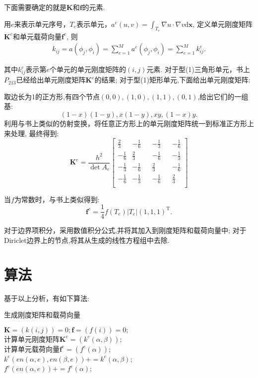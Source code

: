 \documentclass[a4paper, 11pt]{ctexart}
\newcommand\dd{\mathrm{d}}
\newcommand\bx{\boldsymbol{x}}
\newcommand\abs[1]{\lvert #1 \rvert}
\begin{document}
下面需要确定的就是$\boldsymbol K$和$\boldsymbol f$的元素.

用$e$来表示单元序号，$T_e$表示单元，$a^e(u,v)=\int_{T_e}\nabla u·\nabla v\dd \bx$,
定义单元刚度矩阵$\boldsymbol K^e$和单元载荷向量$\boldsymbol f^e$,
则
\begin{align}
	k_{ij}=a(\phi_j,\phi_i)=\sum_{e=1}^Ma^e(\phi_j,\phi_i)=\sum_{e=1}^Mk_{ij}^e.
\end{align}

其中$k_{ij}^e$表示第$e$个单元的单元刚度矩阵的$(i,j)$元素.
对于型(1)三角形单元，书上$P_{213}$已经给出单元刚度矩阵$\boldsymbol K^e$的结果;
对于型(1)矩形单元,下面给出单元刚度矩阵:

取边长为1的正方形,有四个节点$(0,0),(1,0),(1,1),(0,1)$,给出它们的一组基:
$$(1-x)(1-y),x(1-y),xy,(1-x)y.$$
利用与书上类似的仿射变换，将任意正方形上的单元刚度矩阵统一到标准正方形上来处理,
最终得到:
\[ \boldsymbol K^e=\dfrac{h^2}{\det A_e}\begin{bmatrix}
		\frac 23 & -\frac 16 && -\frac 13 && -\frac 16 \\
		-\frac 16 & \frac 23 && -\frac 16 && -\frac 13 \\
		-\frac 13 & -\frac 16 && \frac 23 && -\frac 16 \\
		-\frac 16 & -\frac 13 && -\frac 16 && \frac 23 \\
	\end{bmatrix} \]

当$f$为常数时，与书上类似得到:
\[ \boldsymbol f^e=\dfrac 14f(T_e)\abs{T_e}(1,1,1)^\mathrm T. \]

对于边界项积分，采用数值积分公式,并将其加入到刚度矩阵和载荷向量中;
对于Diriclet边界上的节点,将其从生成的线性方程组中去除.

\section{算法}
基于以上分析，有如下算法:

\begin{algorithm}[H]
\caption{生成刚度矩阵和载荷向量}
\SetAlgoNoLine
$\boldsymbol K= (k(i,j))=0;\boldsymbol f=(f(i))=0;$\\
{
	$\text{计算单元刚度矩阵}\boldsymbol K^e=(k^e(\alpha,\beta))$; \\
	$\text{计算单元载荷向量}\boldsymbol f^e=(f^e(\alpha))$; \\
	$k^e(en(\alpha,e),en(\beta,e))+=k^e(\alpha,\beta)$; \\
	$f^e(en(\alpha,e))+=f^e(\alpha)$; \\
}
\label{al:fem}
\end{algorithm}
\end{document}

